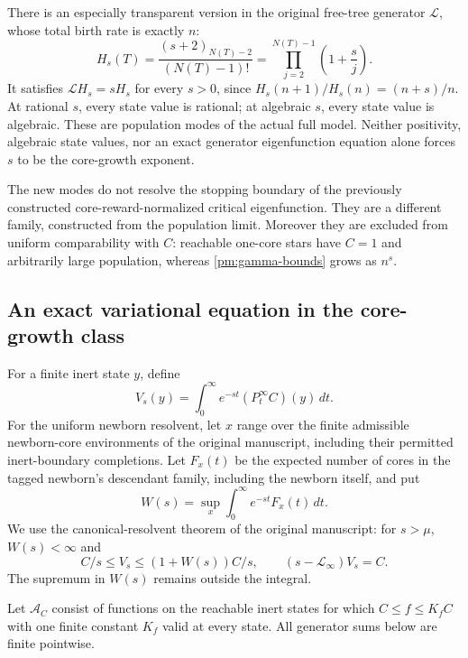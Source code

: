 There is an especially transparent version in the original free-tree
generator $\mathcal L$, whose total birth rate is exactly $n$:
\[
 H_s(T)=\frac{(s+2)_{N(T)-2}}{(N(T)-1)!}
       =\prod_{j=2}^{N(T)-1}\left(1+\frac{s}{j}\right).
\]
It satisfies $\mathcal L H_s=sH_s$ for every $s>0$, since
$H_s(n+1)/H_s(n)=(n+s)/n$.  At rational $s$, every state value is
rational; at algebraic $s$, every state value is algebraic.  These
are population modes of the actual full model.  Neither positivity,
algebraic state values, nor an exact generator eigenfunction equation
alone forces $s$ to be the core-growth exponent.

The new modes do not resolve the stopping boundary of the previously
constructed core-reward-normalized critical eigenfunction.  They are
a different family, constructed from the population limit.  Moreover
they are excluded from uniform comparability with $C$: reachable
one-core stars have $C=1$ and arbitrarily large population, whereas
\eqref{pm:gamma-bounds} grows as $n^s$.

\subsection{An exact variational equation in the core-growth class}

For a finite inert state $y$, define
\[
 V_s(y)=\int_0^\infty e^{-st}(P_t^\infty C)(y)\,dt.
\]
For the uniform newborn resolvent, let $x$ range over the finite
admissible newborn-core environments of the original manuscript,
including their permitted inert-boundary completions.  Let $F_x(t)$
be the expected number of cores in the tagged newborn's descendant
family, including the newborn itself, and put
\[
 W(s)=\sup_x\int_0^\infty e^{-st}F_x(t)\,dt.
\]
We use the canonical-resolvent theorem of the original
manuscript\cite{Long}: for $s>\mu$, $W(s)<\infty$ and
\[
 C/s\le V_s\le(1+W(s))C/s,
 \qquad (s-\mathcal L_\infty)V_s=C.
\]
The supremum in $W(s)$ remains outside the integral.

Let $\mathcal A_C$ consist of functions on the reachable inert states
for which $C\le f\le K_f C$ with one finite constant $K_f$ valid
at every state.  All generator sums below are finite pointwise.


